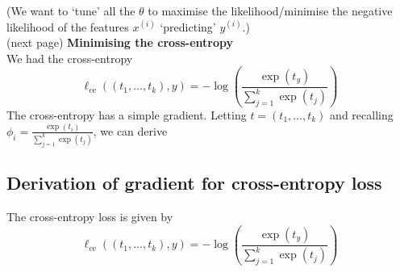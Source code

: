 \documentclass{report}
\begin{document}
(We want to `tune' all the $\theta$ to maximise the likelihood/minimise the negative likelihood
of the features $x^{(i)}$ `predicting' $y^{(i)}$.)\\
(next page)
\newpage
\noindent\textbf{Minimising the cross-entropy}\\
We had the cross-entropy
\begin{equation*}
\ell_{\text{ce}}((t_1,\ldots,t_k),y)=-\log\left(\frac{\exp(t_y)}{\sum^k_{j=1}\exp(t_j)}\right)
\end{equation*}
The cross-entropy has a simple gradient. Letting 
$t=(t_1,\ldots,t_k)$ and recalling $\phi_i=\frac{\exp(t_i)}{\sum^k_{j=1}\exp(t_j)}$, we can derive
\begin{equation*}
\end{equation*}





\newpage

\subsection{Derivation of gradient for cross-entropy loss}
The cross-entropy loss is given by
\begin{equation*}
\ell_{\text{ce}}((t_1,\ldots,t_k),y)=-\log\left(\frac{\exp(t_y)}{\sum^k_{j=1}\exp(t_j)}\right)
\end{equation*}
\end{document}
